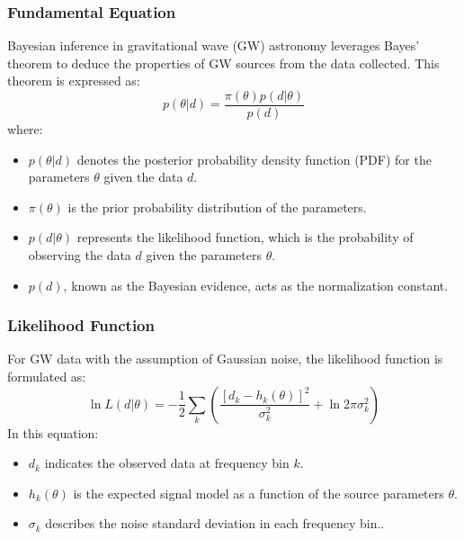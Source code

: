\documentclass[12pt]{article}
\begin{document}
\subsubsection{Fundamental Equation}
Bayesian inference in gravitational wave (GW) astronomy leverages Bayes' theorem \cite{Bilby: A user-friendly, Finn1992} to deduce the properties of GW sources from the data collected. This theorem is expressed as:
\begin{equation}
    p(\theta | d) = \frac{\pi(\theta)p(d | \theta)}{p(d)}
\end{equation}
where:
\begin{itemize}
    \item $p(\theta | d)$ denotes the posterior probability density function (PDF) for the parameters $\theta$ given the data $d$.
    \item $\pi(\theta)$ is the prior probability distribution of the parameters.
    \item $p(d | \theta)$ represents the likelihood function, which is the probability of observing the data $d$ given the parameters $\theta$.
    \item $p(d)$, known as the Bayesian evidence, acts as the normalization constant.
\end{itemize}

\subsubsection{Likelihood Function}
For GW data with the assumption of Gaussian noise, the likelihood function is formulated as:
\begin{equation}
    \ln L(d | \theta) = -\frac{1}{2} \sum_{k} \left( \frac{[d_k - h_k(\theta)]^2}{\sigma_k^2} + \ln 2\pi\sigma_k^2 \right)
\end{equation}
In this equation:
\begin{itemize}
    \item $d_k$ indicates the observed data at frequency bin $k$.
    \item $h_k(\theta)$ is the expected signal model as a function of the source parameters $\theta$.
    \item $\sigma_k$ describes the noise standard deviation in each frequency bin.\cite{Smith2016, Wong2023}.
\end{itemize}

\
\end{document}
